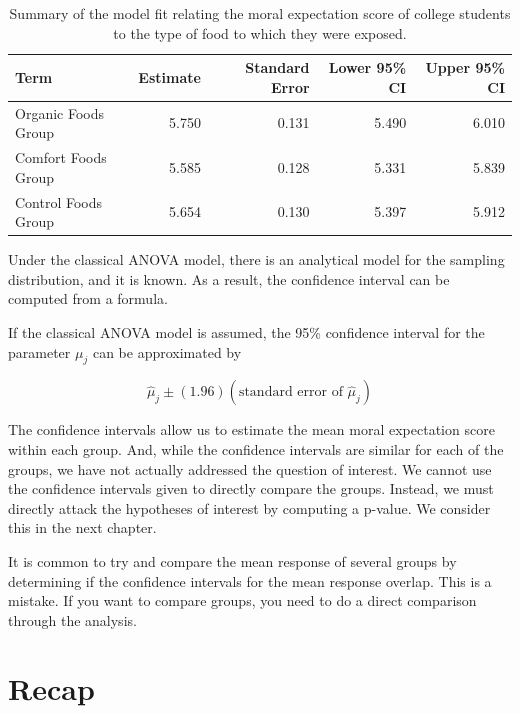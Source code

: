 \documentclass[
]{book}
\theoremstyle{plain}
\theoremstyle{mydefn}
\theoremstyle{myexmpl}
\theoremstyle{remark}
\begin{document}
\begin{table}

\caption{\label{tab:anovamodel-summary}Summary of the model fit relating the moral expectation score of college students to the type of food to which they were exposed.}
\centering
\begin{tabular}[t]{l|r|r|r|r}
\hline
Term & Estimate & Standard Error & Lower 95\% CI & Upper 95\% CI\\
\hline
Organic Foods Group & 5.750 & 0.131 & 5.490 & 6.010\\
\hline
Comfort Foods Group & 5.585 & 0.128 & 5.331 & 5.839\\
\hline
Control Foods Group & 5.654 & 0.130 & 5.397 & 5.912\\
\hline
\end{tabular}
\end{table}

Under the classical ANOVA model, there is an analytical model for the sampling distribution, and it is known. As a result, the confidence interval can be computed from a formula.

\begin{rmdtip}
If the classical ANOVA model is assumed, the 95\% confidence interval for the parameter \(\mu_j\) can be approximated by

\[\widehat{\mu}_j \pm (1.96)\left(\text{standard error of } \widehat{\mu}_j\right)\]
\end{rmdtip}

The confidence intervals allow us to estimate the mean moral expectation score within each group. And, while the confidence intervals are similar for each of the groups, we have not actually addressed the question of interest. We cannot use the confidence intervals given to directly compare the groups. Instead, we must directly attack the hypotheses of interest by computing a p-value. We consider this in the next chapter.

\begin{rmdtip}
It is common to try and compare the mean response of several groups by determining if the confidence intervals for the mean response overlap. This is a mistake. If you want to compare groups, you need to do a direct comparison through the analysis.
\end{rmdtip}

\hypertarget{recap-1}{%
\section{Recap}\label{recap-1}}
\end{document}
